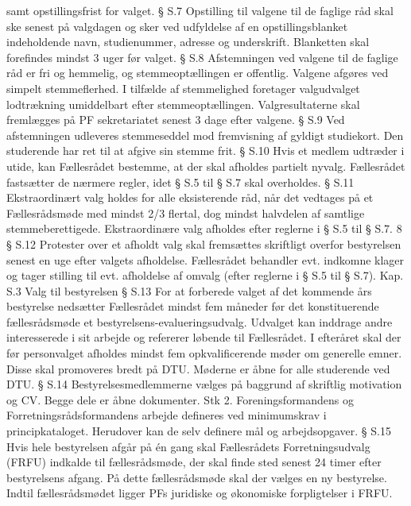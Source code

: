             samt opstillingsfrist for valget.
§ S.7 Opstilling til valgene til de faglige råd skal ske senest på valgdagen og sker ved udfyldelse af en
        opstillingsblanket indeholdende navn, studienummer, adresse og underskrift.
       Blanketten skal forefindes mindst 3 uger før valget.
§ S.8 Afstemningen ved valgene til de faglige råd er fri og hemmelig, og stemmeoptællingen er offentlig. Valgene
        afgøres ved simpelt stemmeflerhed.
        I tilfælde af stemmelighed foretager valgudvalget lodtrækning umiddelbart efter stemmeoptællingen.
          Valgresultaterne skal fremlægges på PF sekretariatet senest 3 dage efter valgene.
§ S.9 Ved afstemningen udleveres stemmeseddel mod fremvisning af gyldigt studiekort. Den studerende har ret til
      at afgive sin stemme frit.
§ S.10 Hvis et medlem udtræder i utide, kan Fællesrådet bestemme, at der skal afholdes partielt nyvalg. Fællesrådet
            fastsætter de nærmere regler, idet § S.5 til § S.7 skal overholdes.
§ S.11 Ekstraordinært valg holdes for alle eksisterende råd, når det vedtages på et Fællesrådsmøde med mindst 2/3
              flertal, dog mindst halvdelen af samtlige stemmeberettigede. Ekstraordinære valg afholdes efter reglerne i §
               S.5 til § S.7.
8
§ S.12
Protester over et afholdt valg skal fremsættes skriftligt overfor bestyrelsen senest en uge efter valgets
afholdelse. Fællesrådet behandler evt. indkomne klager og tager stilling til evt. afholdelse af omvalg (efter
reglerne i § S.5 til § S.7).
Kap. S.3 Valg til bestyrelsen
§ S.13 For at forberede valget af det kommende års bestyrelse nedsætter Fællesrådet mindst fem måneder før det
             konstituerende fællesrådsmøde et bestyrelsens-evalueringsudvalg. Udvalget kan inddrage andre interesserede
               i sit arbejde og refererer løbende til Fællesrådet.
                 I efteråret skal der før personvalget afholdes mindst fem opkvalificerende møder om generelle emner. Disse
                   skal promoveres bredt på DTU. Møderne er åbne for alle studerende ved DTU.
§ S.14 Bestyrelsesmedlemmerne vælges på baggrund af skriftlig motivation og CV. Begge dele er åbne dokumenter.
Stk 2. Foreningsformandens og Forretningsrådsformandens arbejde defineres ved minimumskrav i
principkataloget. Herudover kan de selv definere mål og arbejdsopgaver.
§ S.15
Hvis hele bestyrelsen afgår på én gang skal Fællesrådets Forretningsudvalg (FRFU) indkalde til
fællesrådsmøde, der skal finde sted senest 24 timer efter bestyrelsens afgang. På dette fællesrådsmøde skal
der vælges en ny bestyrelse. Indtil fællesrådsmødet ligger PFs juridiske og økonomiske forpligtelser i FRFU.
